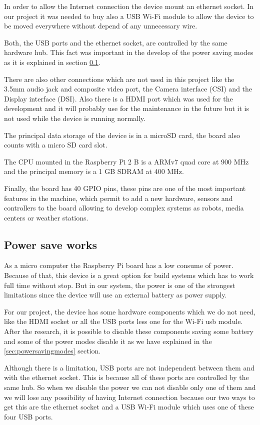 		In order to allow the Internet connection the device mount an ethernet socket. In our project it was needed to buy also a USB Wi-Fi module to allow the device to be moved everywhere without depend of any unnecessary wire.

		Both, the USB ports and the ethernet socket, are controlled by the same hardware hub. This fact was important in the develop of the power saving modes as it is explained in section \ref{subsec:powersave}.

		There are also other connections which are not used in this project like the 3.5mm audio jack and composite video port, the Camera interface (CSI) and the Display interface (DSI). Also there is a HDMI port which was used for the development and it will probably use for the maintenance in the future but it is not used while the device is running normally.

		The principal data storage of the device is in a microSD card, the board also counts with a micro SD card slot.

		The CPU mounted in the Raspberry Pi 2 B is a ARMv7 quad core at 900 MHz and the principal memory is a 1 GB SDRAM at 400 MHz.

		Finally, the board has 40 GPIO pins, these pins are one of the most important features in the machine, which permit to add a new hardware, sensors and controllers to the board allowing to develop complex systems as robots, media centers or weather stations.

		\subsection{Power save works}\label{subsec:powersave}
		As a micro computer the Raspberry Pi board has a low consume of power. Because of that, this device is a great option for build systems which has to work full time without stop. But in our system, the power is one of the strongest limitations since the device will use an external battery as power supply. 
		
		For our project, the device has some hardware components which we do not need, like the HDMI socket or all the USB ports less one for the Wi-Fi usb module. After the research, it is possible to disable these components saving some battery and some of the power modes disable it as we have explained in the \ref{sec:powersavingmodes} section. 

		Although there is a limitation, USB ports are not independent between them and with the ethernet socket. This is because all of these ports are controlled by the same hub. So when we disable the power we can not disable only one of them and we will lose any possibility of having Internet connection because our two ways to get this are the ethernet socket and a USB Wi-Fi module which uses one of these four USB ports.

